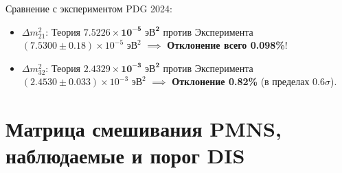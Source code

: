\documentclass[12pt,a4paper]{article}
\begin{document}
	Сравнение с экспериментом PDG 2024:
	\begin{itemize}
		\item $\Delta m_{21}^2$: Теория $\mathbf{7.5226 \times 10^{-5} \text{ эВ}^2}$ против Эксперимента $(7.5300 \pm 0.18) \times 10^{-5} \text{ эВ}^2$ $\implies$ \textbf{Отклонение всего 0.098\%}!
		\item $\Delta m_{32}^2$: Теория $\mathbf{2.4329 \times 10^{-3} \text{ эВ}^2}$ против Эксперимента $(2.4530 \pm 0.033) \times 10^{-3} \text{ эВ}^2$ $\implies$ \textbf{Отклонение 0.82\%} (в пределах $0.6\sigma$).
	\end{itemize}
	
	\section{Матрица смешивания PMNS, наблюдаемые и порог DIS}
	
\end{document}

